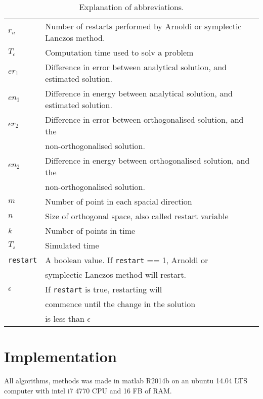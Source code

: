 \begin{table}[h]
\centering
\begin{tabular}{l| l}
$r_n$	& Number of restarts performed by Arnoldi or symplectic Lanczos method.  \\
$T_c$	& Computation time used to solv a problem \\
$er_1$ 	& Difference in error between analytical solution, and estimated solution. \\
$en_1$ 	& Difference in energy between analytical solution, and estimated solution. \\
$er_2$ 	& Difference in error between orthogonalised solution, and the\\& non-orthogonalised solution. \\
$en_2$ 	& Difference in energy between orthogonalised solution, and the\\& non-orthogonalised solution. \\
$m$ 		& Number of point in each spacial direction \\
$n$ 		& Size of orthogonal space, also called restart variable \\
$k$ 		& Number of points in time \\
$T_s$ 	& Simulated time \\
\texttt{restart}& A boolean value. If \texttt{restart} == 1, Arnoldi or \\&symplectic Lanczos method will restart. \\
$\epsilon$ & If \texttt{restart} is true, restarting will\\& commence until the change in the solution\\& is less than $\epsilon$ \\
\end{tabular}
\caption{ Explanation of abbreviations. }
\label{tab:labels}
\end{table}

\section{Implementation}
All algorithms, methods was made in matlab R2014b on an ubuntu 14.04 LTS computer with intel i7 4770 CPU and 16 FB of RAM.
